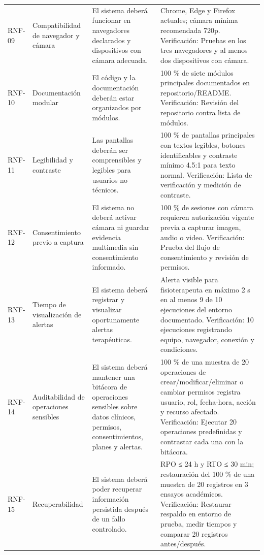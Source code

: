 \documentclass[12pt,a4paper]{article}
\begin{document}
\begin{longtable}{p{}p{}p{}p{}}
RNF-09 & Compatibilidad de navegador y cámara & El sistema deberá funcionar en navegadores declarados y dispositivos con cámara adecuada. & Chrome, Edge y Firefox actuales; cámara mínima recomendada 720p. Verificación: Pruebas en los tres navegadores y al menos dos dispositivos con cámara. \\
RNF-10 & Documentación modular & El código y la documentación deberán estar organizados por módulos. & 100 \% de siete módulos principales documentados en repositorio/README. Verificación: Revisión del repositorio contra lista de módulos. \\
RNF-11 & Legibilidad y contraste & Las pantallas deberán ser comprensibles y legibles para usuarios no técnicos. & 100 \% de pantallas principales con textos legibles, botones identificables y contraste mínimo 4.5:1 para texto normal. Verificación: Lista de verificación y medición de contraste. \\
RNF-12 & Consentimiento previo a captura & El sistema no deberá activar cámara ni guardar evidencia multimedia sin consentimiento informado. & 100 \% de sesiones con cámara requieren autorización vigente previa a capturar imagen, audio o video. Verificación: Prueba del flujo de consentimiento y revisión de permisos. \\
RNF-13 & Tiempo de visualización de alertas & El sistema deberá registrar y visualizar oportunamente alertas terapéuticas. & Alerta visible para fisioterapeuta en máximo 2 s en al menos 9 de 10 ejecuciones del entorno documentado. Verificación: 10 ejecuciones registrando equipo, navegador, conexión y condiciones. \\
RNF-14 & Auditabilidad de operaciones sensibles & El sistema deberá mantener una bitácora de operaciones sensibles sobre datos clínicos, permisos, consentimientos, planes y alertas. & 100 \% de una muestra de 20 operaciones de crear/modificar/eliminar o cambiar permisos registra usuario, rol, fecha-hora, acción y recurso afectado. Verificación: Ejecutar 20 operaciones predefinidas y contrastar cada una con la bitácora. \\
RNF-15 & Recuperabilidad & El sistema deberá poder recuperar información persistida después de un fallo controlado. & RPO ≤ 24 h y RTO ≤ 30 min; restauración del 100 \% de una muestra de 20 registros en 3 ensayos académicos. Verificación: Restaurar respaldo en entorno de prueba, medir tiempos y comparar 20 registros antes/después. \\
\bottomrule\end{longtable}\normalsize
\end{document}
